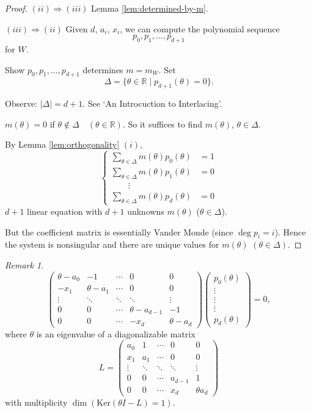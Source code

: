 \documentclass[
]{book}
\theoremstyle{definition}
\theoremstyle{definition}
\theoremstyle{definition}
\theoremstyle{definition}
\theoremstyle{remark}
\newtheorem*{remark}{Remark}
\begin{document}
\begin{proof}
\((ii)\Rightarrow (iii)\) Lemma \ref{lem:determined-by-m}.

\((iii)\Rightarrow (ii)\)
Given \(d\), \(a_i\), \(x_i\), we can compute the polynomial sequence
\[p_0, p_1, \ldots, p_{d+1}\]
for \(W\).

Show \(p_0, p_1, \ldots, p_{d+1}\) determines \(m = m_W\). Set
\[\Delta = \{\theta\in \mathbb{R}\mid p_{d+1}(\theta) = 0\}.\]

Observe: \(|\Delta| = d+1\). See `An Introcuction to Interlacing'.

\(m(\theta) = 0\) if \(\theta\not\in\Delta\quad (\theta\in \mathbb{R})\). So it suffices to find \(m(\theta)\), \(\theta\in \Delta\).

By Lemma \ref{lem:orthogonality} \((i)\),
\[
\begin{cases}
\sum_{\theta\in\Delta} m(\theta)p_0(\theta) & = 1\\
\sum_{\theta\in\Delta} m(\theta)p_1(\theta) & = 0\\
\qquad \vdots & \\
\sum_{\theta\in\Delta} m(\theta)p_d(\theta) & = 0
\end{cases}
\]
\(d+1\) linear equation with \(d+1\) unknowns \(m(\theta)\) (\(\theta\in \Delta\)).

But the coefficient matrix is essentially Vander Monde (since \(\deg p_i = i\)).
Hence the system is nonsingular and there are unique values for \(m(\theta)\) \((\theta\in \Delta)\).
\end{proof}

\begin{remark}
\[\begin{pmatrix}
\theta-a_0 & -1 & \cdots & 0 & 0 \\
-x_1 & \theta - a_1  & \cdots & 0 & 0 \\
\vdots & \ddots  & \ddots & \ddots & \vdots \\
0 & 0 & \cdots & \theta-a_{d-1}  & -1\\
0 & 0 & \cdots & -x_d & \theta - a_d
\end{pmatrix}
\begin{pmatrix}
p_0(\theta)\\
\vdots\\
\vdots\\
\vdots\\
p_d(\theta)
\end{pmatrix} = 0,\]
where \(\theta\) is an eigenvalue of a diagonalizable matrix
\[
L = 
\begin{pmatrix}
a_0 & 1 & \cdots & 0 & 0 \\
x_1 & a_1  & \cdots & 0 & 0 \\
\vdots & \ddots  & \ddots & \ddots & \vdots \\
0 & 0 & \cdots & a_{d-1}  & 1\\
0 & 0 & \cdots & x_d & \theta a_d
\end{pmatrix}
\]
with multiplicity \(\dim (\mathrm{Ker}(\theta I - L) = 1)\).
\end{remark}
\end{document}
